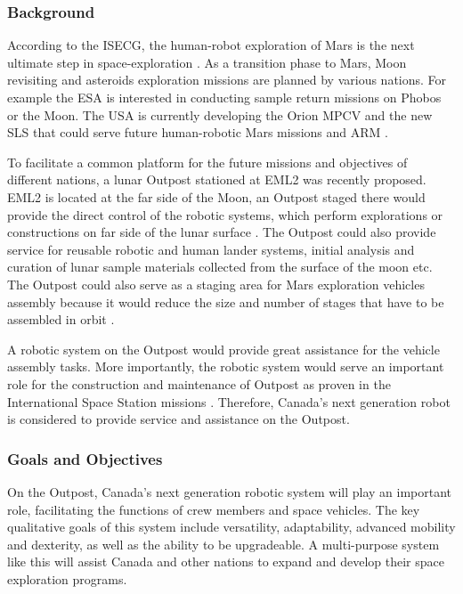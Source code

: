\subsubsection{Background}
According to the \gls{ISECG}, the human-robot exploration of Mars is the next ultimate step in space-exploration \cite{RFP}. As a transition phase to Mars, Moon revisiting and asteroids exploration missions are planned by various nations. For example the \gls{ESA} is interested in conducting sample return missions on Phobos or the Moon. The \gls{USA} is currently developing the Orion \gls{MPCV} and the new \gls{SLS} that could serve future human-robotic Mars missions and \gls{ARM} \cite{RFP}.

To facilitate a common platform for the future missions and objectives of different nations, a lunar Outpost stationed at \gls{EML2} was recently proposed. \gls{EML2} is located at the far side of the Moon, an Outpost staged there would provide the direct control of the robotic systems, which perform explorations or constructions on far side of the lunar surface \cite{moon_farside}. The Outpost could also provide service for reusable robotic and human lander systems, initial analysis and curation of lunar sample materials collected from the surface of the moon etc. The Outpost could also serve as a staging area for Mars exploration vehicles assembly because it would reduce the size and number of stages that have to be assembled in orbit \cite{deep_space}.

A robotic system on the Outpost would provide great assistance for the vehicle assembly tasks. More importantly, the robotic system would serve an important role for the construction and maintenance of Outpost as proven in the International Space Station missions \cite{deep_auto}. Therefore, Canada's next generation robot is considered to provide service and assistance on the Outpost.

\subsubsection{Goals and Objectives}
On the Outpost, Canada's next generation robotic system will play an important role, facilitating the functions of crew members and space vehicles. The key qualitative goals of this system include versatility, adaptability, advanced mobility and dexterity, as well as the ability to be upgradeable.\cite{RFP} A multi-purpose system like this will assist Canada and other nations to expand and develop their space exploration programs. 


